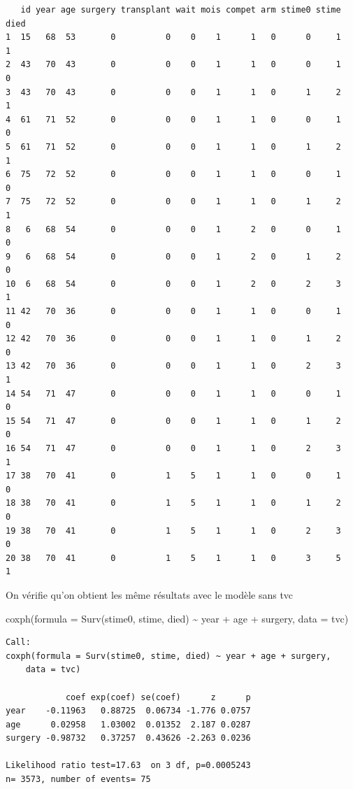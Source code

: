 \documentclass[
  12pt,
  letterpaper,
  DIV=11,
  numbers=noendperiod,
  onepage,
  openany]{scrreprt}
\newenvironment{Shaded}{\begin{snugshade}}{\end{snugshade}}
\newcommand{\AttributeTok}[1]{\textcolor[rgb]{0.80,0.80,0.80}{#1}}
\newcommand{\FunctionTok}[1]{\textcolor[rgb]{0.94,0.94,0.56}{#1}}
\newcommand{\NormalTok}[1]{\textcolor[rgb]{0.80,0.80,0.80}{#1}}
\newcommand{\SpecialCharTok}[1]{\textcolor[rgb]{0.86,0.64,0.64}{#1}}
\begin{document}
\begin{verbatim}
   id year age surgery transplant wait mois compet arm stime0 stime died
1  15   68  53       0          0    0    1      1   0      0     1    1
2  43   70  43       0          0    0    1      1   0      0     1    0
3  43   70  43       0          0    0    1      1   0      1     2    1
4  61   71  52       0          0    0    1      1   0      0     1    0
5  61   71  52       0          0    0    1      1   0      1     2    1
6  75   72  52       0          0    0    1      1   0      0     1    0
7  75   72  52       0          0    0    1      1   0      1     2    1
8   6   68  54       0          0    0    1      2   0      0     1    0
9   6   68  54       0          0    0    1      2   0      1     2    0
10  6   68  54       0          0    0    1      2   0      2     3    1
11 42   70  36       0          0    0    1      1   0      0     1    0
12 42   70  36       0          0    0    1      1   0      1     2    0
13 42   70  36       0          0    0    1      1   0      2     3    1
14 54   71  47       0          0    0    1      1   0      0     1    0
15 54   71  47       0          0    0    1      1   0      1     2    0
16 54   71  47       0          0    0    1      1   0      2     3    1
17 38   70  41       0          1    5    1      1   0      0     1    0
18 38   70  41       0          1    5    1      1   0      1     2    0
19 38   70  41       0          1    5    1      1   0      2     3    0
20 38   70  41       0          1    5    1      1   0      3     5    1
\end{verbatim}

On vérifie qu'on obtient les même résultats avec le modèle sans tvc

\begin{Shaded}
\begin{Highlighting}[]
\FunctionTok{coxph}\NormalTok{(}\AttributeTok{formula =} \FunctionTok{Surv}\NormalTok{(stime0, stime, died) }\SpecialCharTok{\textasciitilde{}}\NormalTok{ year }\SpecialCharTok{+}\NormalTok{ age }\SpecialCharTok{+}\NormalTok{ surgery, }\AttributeTok{data =}\NormalTok{ tvc)}
\end{Highlighting}
\end{Shaded}

\begin{verbatim}
Call:
coxph(formula = Surv(stime0, stime, died) ~ year + age + surgery, 
    data = tvc)

            coef exp(coef) se(coef)      z      p
year    -0.11963   0.88725  0.06734 -1.776 0.0757
age      0.02958   1.03002  0.01352  2.187 0.0287
surgery -0.98732   0.37257  0.43626 -2.263 0.0236

Likelihood ratio test=17.63  on 3 df, p=0.0005243
n= 3573, number of events= 75 
\end{verbatim}
\end{document}
